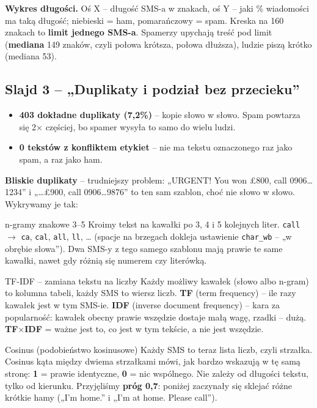 \documentclass[11pt,a4paper]{article}
\begin{document}
\textbf{Wykres długości.} Oś X -- długość SMS-a w znakach, oś Y -- jaki \% wiadomości ma taką długość; niebieski = ham,
pomarańczowy = spam. Kreska na 160 znakach to \textbf{limit jednego SMS-a}. Spamerzy upychają treść pod limit
(\textbf{mediana} 149 znaków, czyli połowa krótsza, połowa dłuższa), ludzie piszą krótko (mediana 53).

\subsection{Slajd 3 -- „Duplikaty i podział bez przecieku”}

\begin{itemize}
  \item \textbf{403 dokładne duplikaty (7,2\%)} -- kopie słowo w słowo. Spam powtarza się 2× częściej, bo spamer wysyła to samo do wielu ludzi.
  \item \textbf{0 tekstów z konfliktem etykiet} -- nie ma tekstu oznaczonego raz jako spam, a raz jako ham.
\end{itemize}

\textbf{Bliskie duplikaty} -- trudniejszy problem: „URGENT! You won £800, call 0906…1234” i „…£900, call 0906…9876” to
ten sam szablon, choć nie słowo w słowo. Wykrywamy je tak:

\begin{pojecie}{n-gramy znakowe 3--5}
Kroimy tekst na kawałki po 3, 4 i 5 kolejnych liter. \texttt{call} $\to$ \texttt{\textvisiblespace ca}, \texttt{cal},
\texttt{all}, \texttt{ll\textvisiblespace}, … (spacje na brzegach dokleja ustawienie \texttt{char\_wb} -- „w obrębie słowa”).
Dwa SMS-y z tego samego szablonu mają prawie te same kawałki, nawet gdy różnią się numerem czy literówką.
\end{pojecie}

\begin{pojecie}{TF-IDF -- zamiana tekstu na liczby}
Każdy możliwy kawałek (słowo albo n-gram) to kolumna tabeli, każdy SMS to wiersz liczb.
\textbf{TF} (term frequency) -- ile razy kawałek jest w tym SMS-ie.
\textbf{IDF} (inverse document frequency) -- kara za popularność: kawałek obecny prawie wszędzie dostaje małą wagę,
rzadki -- dużą. \textbf{TF$\times$IDF} = ważne jest to, co jest w tym tekście, a nie jest wszędzie.
\end{pojecie}

\begin{pojecie}{Cosinus (podobieństwo kosinusowe)}
Każdy SMS to teraz lista liczb, czyli strzałka. Cosinus kąta między dwiema strzałkami mówi, jak bardzo wskazują w tę samą
stronę: \textbf{1} = prawie identyczne, \textbf{0} = nic wspólnego. Nie zależy od długości tekstu, tylko od kierunku.
Przyjęliśmy \textbf{próg 0,7}: poniżej zaczynały się sklejać różne krótkie hamy („I'm home.” i „I'm at home. Please call”).
\end{pojecie}
\end{document}
